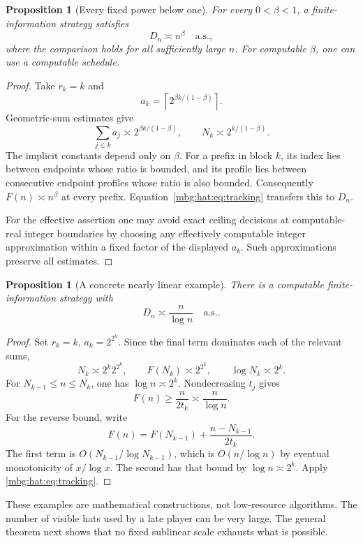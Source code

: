 \documentclass[11pt,letterpaper]{article}
\newtheorem{proposition}[theorem]{Proposition}
\theoremstyle{definition}
\newcommand{\as}{\text{a.s.}}
\begin{document}
\begin{proposition}[Every fixed power below one]\label{mbg:hat:prop:powers}
For every \(0<\beta<1\), a finite-information strategy satisfies
\[
  D_n\asymp n^\beta\quad\as,
\]
where the comparison holds for all sufficiently large \(n\).
For computable \(\beta\), one can use a computable schedule.
\end{proposition}
\begin{proof}
Take \(r_k=k\) and
\[
  a_k=\left\lceil2^{\beta k/(1-\beta)}\right\rceil.
\]
Geometric-sum estimates give
\[
  \sum_{j\le k}a_j\asymp2^{\beta k/(1-\beta)},\qquad
  N_k\asymp2^{k/(1-\beta)}.
\]
The implicit constants depend only on \(\beta\).
For a prefix in block \(k\), its index lies between endpoints
whose ratio is bounded, and its profile lies between consecutive
endpoint profiles whose ratio is also bounded.
Consequently \(F(n)\asymp n^\beta\) at every prefix.
Equation~\eqref{mbg:hat:eq:tracking} transfers this to \(D_n\).

For the effective assertion one may avoid exact ceiling decisions at
computable-real integer boundaries by choosing any effectively
computable integer approximation within a fixed factor of the
displayed \(a_k\). Such approximations preserve all estimates.
\end{proof}

\begin{proposition}[A concrete nearly linear example]\label{mbg:hat:prop:nlogn}
There is a computable finite-information strategy with
\[
  D_n\asymp\frac{n}{\log n}\quad\as.
\]
\end{proposition}
\begin{proof}
Set \(r_k=k\), \(a_k=2^{2^k}\). Since the final term dominates
each of the relevant sums,
\[
  N_k\asymp 2^k2^{2^k},\qquad
  F(N_k)\asymp2^{2^k},\qquad
  \log N_k\asymp2^k.
\]
For \(N_{k-1}\le n\le N_k\), one has
\(\log n\asymp2^k\). Nondecreasing \(t_j\) gives
\[
  F(n)\ge\frac{n}{2t_k}\asymp\frac n{\log n}.
\]
For the reverse bound, write
\[
  F(n)=F(N_{k-1})+\frac{n-N_{k-1}}{2t_k}.
\]
The first term is \(O(N_{k-1}/\log N_{k-1})\), which is
\(O(n/\log n)\) by eventual monotonicity of \(x/\log x\).
The second has that bound by \(\log n\asymp2^k\).
Apply \eqref{mbg:hat:eq:tracking}.
\end{proof}

These examples are mathematical constructions, not low-resource
algorithms. The number of visible hats used by a late player can
be very large. The general theorem next shows that no fixed
sublinear scale exhausts what is possible.
\end{document}
